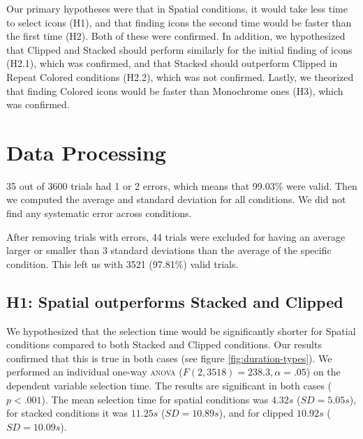 \documentclass{tufte-book} %
\begin{document}
Our primary hypotheses were that in Spatial conditions, it would take less time to select icons (H1), and that finding icons the second time would be faster than the first time (H2). Both of these were confirmed. In addition, we hypothesized that Clipped and Stacked should perform similarly for the initial finding of icons (H2.1), which was confirmed, and that Stacked should outperform Clipped in Repeat Colored conditions (H2.2), which was not confirmed.
Lastly, we theorized that finding Colored icons would be faster than Monochrome ones (H3), which was confirmed.

\section{Data Processing}
35 out of 3600 trials had 1 or 2 errors, which means that 99.03\% were valid. Then we computed the average and standard deviation for all conditions. We did not find any systematic error across conditions.

After removing trials with errors, 44 trials were excluded for having an average larger or smaller than 3 standard deviations than the average of the specific condition. This left us with 3521 (97.81\%) valid trials.

\subsection{H1: Spatial outperforms Stacked and Clipped}
We hypothesized that the selection time would be significantly shorter for Spatial conditions compared to both Stacked and Clipped conditions. Our results confirmed that this is true in both cases (see figure \ref{fig:duration-types}). We performed an individual one-way \textsc{anova} ($F(2,3518) = 238.3, \alpha = .05$) on the dependent variable selection time. The results are significant in both cases ($p < .001$). The mean selection time for spatial conditions was $4.32 s$ ($SD = 5.05 s$), for stacked conditions it was $11.25 s$ ($SD = 10.89 s$), and for clipped $10.92 s$ ($SD = 10.09 s$).
\end{document}
